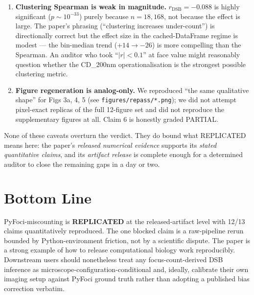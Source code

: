 \documentclass[11pt]{article}
\begin{document}
\begin{enumerate}
\item \textbf{Clustering Spearman is weak in magnitude.} $r_{\text{DSB}}=-0.088$
is highly significant ($p\sim10^{-33}$) purely because $n=18{,}168$, not because
the effect is large. The paper's phrasing (``clustering increases under-count'')
is directionally correct but the effect size in the cached-DataFrame regime is
modest --- the bin-median trend ($+14 \to -26$) is more compelling than the
Spearman. An auditor who took ``$|r|<0.1$'' at face value might reasonably
question whether the CD\_200nm operationalisation is the strongest possible
clustering metric.

\item \textbf{Figure regeneration is analog-only.} We reproduced ``the same
qualitative shape'' for Figs 3a, 4, 5 (see \texttt{figures/repass/*.png}); we
did not attempt pixel-exact replicas of the full 12-figure set and did not
reproduce the supplementary figures at all. Claim 6 is honestly graded
\textsc{PARTIAL}.

\end{enumerate}

None of these caveats overturn the verdict. They do bound what \textsc{REPLICATED}
means here: the paper's \emph{released numerical evidence} supports its
\emph{stated quantitative claims}, and its \emph{artifact release} is complete
enough for a determined auditor to close the remaining gaps in a day or two.



\section{Bottom Line}

PyFoci-miscounting is \textbf{REPLICATED} at the released-artifact level with
12/13 claims quantitatively reproduced. The one blocked claim is a raw-pipeline
rerun bounded by Python-environment friction, not by a scientific dispute. The
paper is a strong example of how to release computational biology work
reproducibly. Downstream users should nonetheless treat any focus-count-derived
DSB inference as microscope-configuration-conditional and, ideally, calibrate
their own imaging setup against PyFoci ground truth rather than adopting a
published bias correction verbatim.
\end{document}
